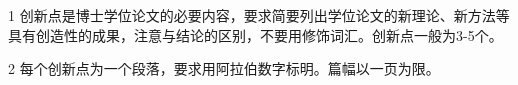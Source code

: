 

1 创新点是博士学位论文的必要内容，要求简要列出学位论文的新理论、新方法等具有创造性的成果，注意与结论的区别，不要用修饰词汇。创新点一般为3-5个。

2 每个创新点为一个段落，要求用阿拉伯数字标明。篇幅以一页为限。
